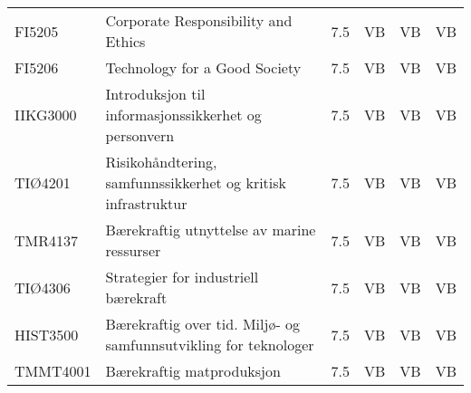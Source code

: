 \documentclass{article}
\begin{document}
\begin{table}[]
\begin{tabular}{llllll}
FI5205   & Corporate   Responsibility and Ethics                              & 7.5 & VB & VB & VB \\
FI5206   & Technology   for a Good Society                                    & 7.5 & VB & VB & VB \\
IIKG3000 & Introduksjon   til informasjonssikkerhet og personvern             & 7.5 & VB & VB & VB \\
TIØ4201  & Risikohåndtering,   samfunnssikkerhet og kritisk infrastruktur     & 7.5 & VB & VB & VB \\
TMR4137  & Bærekraftig   utnyttelse av marine ressurser                       & 7.5 & VB & VB & VB \\
TIØ4306  & Strategier   for industriell bærekraft                             & 7.5 & VB & VB & VB \\
HIST3500 & Bærekraftig   over tid. Miljø- og samfunnsutvikling for teknologer & 7.5 & VB & VB & VB \\
TMMT4001 & Bærekraftig   matproduksjon                                        & 7.5 & VB & VB & VB
\end{tabular}
\end{table}

\newpage



\end{document}
